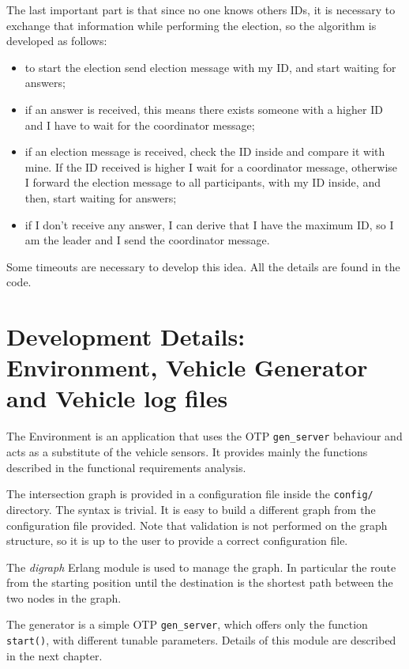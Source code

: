 \documentclass{memoir}
\begin{document}
The last important part is that since no one knows others IDs, it is necessary to exchange that information while performing the election, so the algorithm is developed as follows:

\begin{itemize}
	\item to start the election send election message with my ID, and start waiting for answers;
	\item if an answer is received, this means there exists someone with a higher ID and I have to wait for the coordinator message;
	\item if an election message is received, check the ID inside and compare it with mine. If the ID received is higher I wait for a coordinator message, otherwise I forward the election message to all participants, with my ID inside, and then, start waiting for answers;
	\item if I don't receive any answer, I can derive that I have the maximum ID, so I am the leader and I send the coordinator message.
\end{itemize}

Some timeouts are necessary to develop this idea. All the details are found in the code.

\section{Development Details: Environment, Vehicle Generator and Vehicle log files}
The Environment is an application that uses the OTP \verb|gen_server| behaviour and acts as a substitute of the vehicle sensors. It provides mainly the functions described in the functional requirements analysis.

The intersection graph is provided in a configuration file inside the \verb|config/| directory. The syntax is trivial. It is easy to build a different graph from the configuration file provided. Note that validation is not performed on the graph structure, so it is up to the user to provide a correct configuration file.

The \emph{digraph} Erlang module is used to manage the graph. In particular the route from the starting position until the destination is the shortest path between the two nodes in the graph.

\bigskip
The generator is a simple OTP \verb|gen_server|, which offers only the function \verb|start()|, with different tunable parameters. Details of this module are described in the next chapter.
\end{document}
